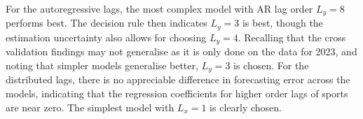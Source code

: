 \begin{figure}[htbp]
    \centering
    \caption{Cross validated out-of-sample forecasting accuracy for varying lag orders, measured by root mean square error.
    Errorbars are standard deviations of accuracy across folds. The horizontal line represents the 1-$\sigma$ decision rule.
    The smaller errorbars represent uncertainty in $\mu_{\text{RMSPE}} + \sigma_{\text{RMSPE}}$}
    \label{fig:modelling:cv_lags}
    \begin{subfigure}[t]{0.49\textwidth}
        \centering
        
        \vspace{0.1em}
    \end{subfigure}
    \hfill
    \begin{subfigure}[t]{0.49\textwidth}
        \centering
        
        \vspace{0.1em}
    \end{subfigure}
\end{figure}

For the autoregressive lags, the most complex model with AR lag order $L_y = 8$ performs best. The decision rule
then indicates $L_y = 3$ is best, though the estimation uncertainty also allows for choosing $L_y = 4$.
Recalling that the cross validation findings may not generalise as it is only done on the data for 2023, and noting that
simpler models generalise better, $L_y = 3$ is chosen.
For the distributed lags, there is no appreciable difference in forecasting error across the models, indicating that
the regression coefficients for higher order lags of sports are near zero.
The simplest model with $L_x = 1$ is clearly chosen.


